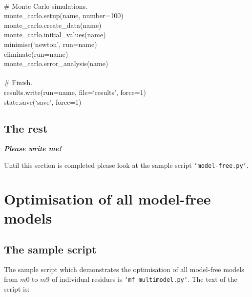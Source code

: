 \begin{exampleenv}
 \\
\# Monte Carlo simulations. \\
monte\_carlo.setup(name, number=100) \\
monte\_carlo.create\_data(name) \\
monte\_carlo.initial\_values(name) \\
minimise(`newton', run=name) \\
eliminate(run=name) \\
monte\_carlo.error\_analysis(name) \\
 \\
\# Finish. \\
results.write(run=name, file=`results', force=1) \\
state.save(`save', force=1)
\end{exampleenv}



\subsection{The rest}

\textbf{\textit{Please write me!}}

Until this section is completed please look at the sample script \texttt{`model-free.py'}.




\section{Optimisation of all model-free models}



\subsection{The sample script}

The sample script which demonstrates the optimisation of all model-free models from $m0$ to $m9$ of individual residues is \texttt{`mf\_multimodel.py'}.  The text of the script is:


